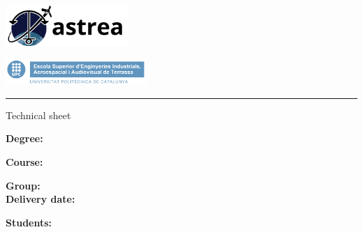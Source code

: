 
\thispagestyle{CoverPage}


\begin{center}\bf

\includegraphics[width=0.35\textwidth]{./doc_config/images/logo.png}

\vspace{50pt}

{\large \School}

\vspace{10pt}

\includegraphics[width=0.4\textwidth]{./doc_config/images/UPC_ESEIAAT.jpg}

\vspace{40pt}

{\fontsize{30pt}{20pt}\selectfont \ProjectName}

\vspace{10pt}

{\Huge \Acronym}


\textcolor{UPC_blue}{\rule{\textwidth}{.6pt}}

{\Large Technical sheet}

\end{center}

\vspace{10pt}

\textbf{Degree:} \Degree

\textbf{Course:} \Course

\textbf{Group:} \GrCode\\

\textbf{Delivery date:} \DocDate\\

\vspace{10pt}

\textbf{Students:}\vspace{7pt}

